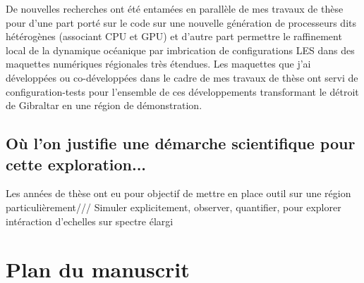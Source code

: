 De nouvelles recherches ont été entamées en parallèle de mes travaux de thèse pour d'une part porté sur le code sur une nouvelle génération de processeurs dits hétérogènes (associant CPU et GPU) et d'autre part permettre le raffinement local de la dynamique océanique par imbrication de configurations LES dans des maquettes numériques régionales très étendues. Les maquettes que j'ai développées ou co-développées dans le cadre de mes travaux de thèse ont servi de configuration-tests pour l'ensemble de ces développements transformant le détroit de Gibraltar en une région de démonstration.\\
\color{blue}
\subsection{Où l'on justifie une démarche scientifique pour cette exploration...}
\color{black}
Les années de thèse ont eu pour objectif de mettre en place outil sur une région particulièrement/// Simuler explicitement, observer, quantifier, pour explorer intéraction d'echelles sur spectre élargi


\section{Plan du manuscrit}






